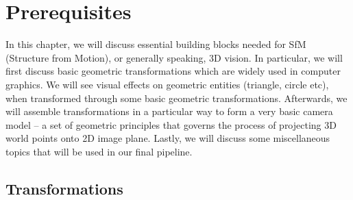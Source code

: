 \documentclass{book}
\begin{document}
    \chapter{Prerequisites}
        In this chapter, we will discuss essential building blocks needed for SfM (Structure from Motion), or generally speaking, 3D vision.
        In particular, we will first discuss basic geometric transformations which are widely used in computer graphics. We will see visual
        effects on geometric entities (triangle, circle etc), when transformed through some basic geometric transformations. Afterwards, we 
        will assemble transformations in a particular way to form a very basic camera model -- a set of geometric principles that governs the
        process of projecting 3D world points onto 2D image plane. Lastly, we will discuss some miscellaneous topics that will be used in 
        our final pipeline. 

        \section{Transformations}
            
\end{document}
